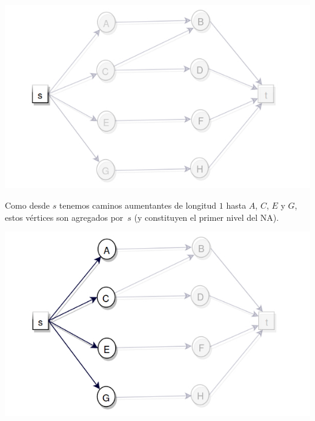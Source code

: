 \documentclass[10pt,a4paper]{article}
\begin{document}
\begin{center}


    \begin{adjustbox}{max size={\textwidth}{\textheight}}
        \includegraphics{definitions/D1.jpg}
        \end{adjustbox}
    
\end{center}

Como desde $s$ tenemos caminos aumentantes de longitud $1$ hasta $A$, $C$, $E$ y $G$, estos vértices son agregados por $s$ (y constituyen el primer nivel del NA).

\begin{center}

    \begin{adjustbox}{max size={\textwidth}{\textheight}}
        \includegraphics{definitions/D2.jpg}
        \end{adjustbox}
    
\end{center}
\end{document}
